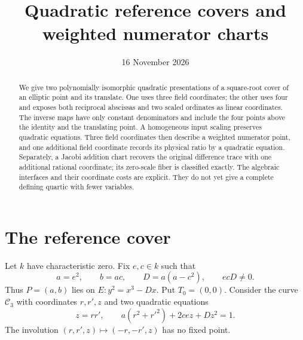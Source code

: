 \documentclass[11pt,a4paper]{article}
\title{Quadratic reference covers and weighted numerator charts}
\author{}\date{16 November 2026}
\begin{document}
\maketitle
\begin{abstract}
We give two polynomially isomorphic quadratic presentations of a
square-root cover of an elliptic point and its translate. One uses
three field coordinates; the other uses four and exposes both
reciprocal abscissas and two scaled ordinates as linear coordinates.
The inverse maps have only constant denominators and include the
four points above the identity and the translating point. A homogeneous
input scaling preserves quadratic equations. Three field coordinates
then describe a weighted numerator point, and one additional field
coordinate records its physical ratio by a quadratic equation.
Separately, a Jacobi addition chart recovers the original difference
trace with one additional rational coordinate; its zero-scale fiber
is classified exactly. The algebraic interfaces and their coordinate
costs are explicit. They do not yet give a complete defining quartic
with fewer variables.
\end{abstract}

\section{The reference cover}
Let $k$ have characteristic zero. Fix $e,c\in k$ such that
\[
 a=e^2,\qquad b=ac,\qquad D=a(a-c^2),\qquad ecD\ne0.
\]
Thus $P=(a,b)$ lies on $E:y^2=x^3-Dx$. Put $T_0=(0,0)$.
Consider the curve $\mathcal C_3$ with coordinates $r,r',z$ and
two quadratic equations
\begin{equation}\label{eq:three}
 z=rr',\qquad a(r^2+r'^2)+2cez+Dz^2=1.
\end{equation}
The involution $(r,r',z)\mapsto(-r,-r',z)$ has no fixed point.
\end{document}
